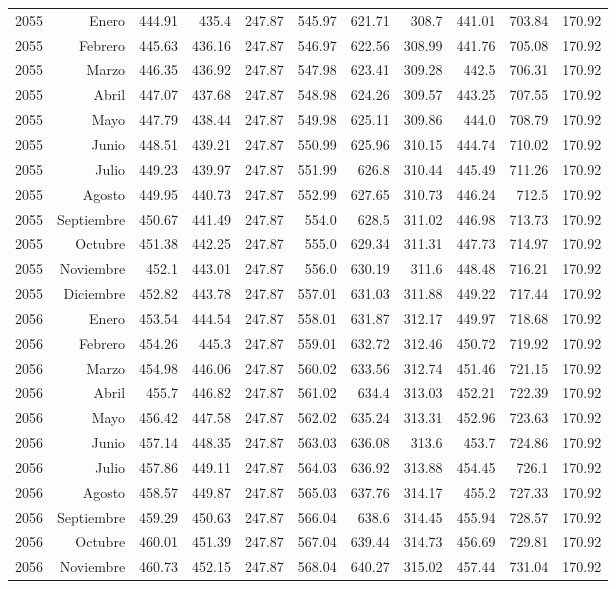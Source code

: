 \documentclass{article}%
\begin{document}
\begin{longtable}{|l r|r|r|r|r|r|r|r|r|r|}
2055&Enero&444.91&435.4&247.87&545.97&621.71&308.7&441.01&703.84&170.92\\%
2055&Febrero&445.63&436.16&247.87&546.97&622.56&308.99&441.76&705.08&170.92\\%
2055&Marzo&446.35&436.92&247.87&547.98&623.41&309.28&442.5&706.31&170.92\\%
2055&Abril&447.07&437.68&247.87&548.98&624.26&309.57&443.25&707.55&170.92\\%
2055&Mayo&447.79&438.44&247.87&549.98&625.11&309.86&444.0&708.79&170.92\\%
2055&Junio&448.51&439.21&247.87&550.99&625.96&310.15&444.74&710.02&170.92\\%
2055&Julio&449.23&439.97&247.87&551.99&626.8&310.44&445.49&711.26&170.92\\%
2055&Agosto&449.95&440.73&247.87&552.99&627.65&310.73&446.24&712.5&170.92\\%
2055&Septiembre&450.67&441.49&247.87&554.0&628.5&311.02&446.98&713.73&170.92\\%
2055&Octubre&451.38&442.25&247.87&555.0&629.34&311.31&447.73&714.97&170.92\\%
2055&Noviembre&452.1&443.01&247.87&556.0&630.19&311.6&448.48&716.21&170.92\\%
2055&Diciembre&452.82&443.78&247.87&557.01&631.03&311.88&449.22&717.44&170.92\\%
2056&Enero&453.54&444.54&247.87&558.01&631.87&312.17&449.97&718.68&170.92\\%
2056&Febrero&454.26&445.3&247.87&559.01&632.72&312.46&450.72&719.92&170.92\\%
2056&Marzo&454.98&446.06&247.87&560.02&633.56&312.74&451.46&721.15&170.92\\%
2056&Abril&455.7&446.82&247.87&561.02&634.4&313.03&452.21&722.39&170.92\\%
2056&Mayo&456.42&447.58&247.87&562.02&635.24&313.31&452.96&723.63&170.92\\%
2056&Junio&457.14&448.35&247.87&563.03&636.08&313.6&453.7&724.86&170.92\\%
2056&Julio&457.86&449.11&247.87&564.03&636.92&313.88&454.45&726.1&170.92\\%
2056&Agosto&458.57&449.87&247.87&565.03&637.76&314.17&455.2&727.33&170.92\\%
2056&Septiembre&459.29&450.63&247.87&566.04&638.6&314.45&455.94&728.57&170.92\\%
2056&Octubre&460.01&451.39&247.87&567.04&639.44&314.73&456.69&729.81&170.92\\%
2056&Noviembre&460.73&452.15&247.87&568.04&640.27&315.02&457.44&731.04&170.92\\%

\end{longtable}
\end{document}
